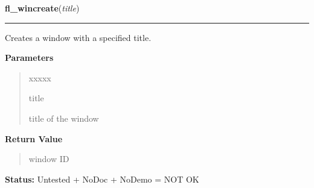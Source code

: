 \hspace{.8\funcindent}\begin{boxedminipage}{\funcwidth}

    \raggedright \textbf{fl\_wincreate}(\textit{title})

    \vspace{-1.5ex}

    \rule{\textwidth}{0.5\fboxrule}
\setlength{\parskip}{2ex}
    Creates a window with a specified title.

\setlength{\parskip}{1ex}
      \textbf{Parameters}
      \vspace{-1ex}

      \begin{quote}
        \begin{Ventry}{xxxxx}

          \item[title]

          title of the window

        \end{Ventry}

      \end{quote}

      \textbf{Return Value}
    \vspace{-1ex}

      \begin{quote}
      window ID

      \end{quote}

\textbf{Status:} Untested + NoDoc + NoDemo = NOT OK



    \end{boxedminipage}

    \label{xformslib:library:fl_winshow}

    \vspace{0.5ex}

